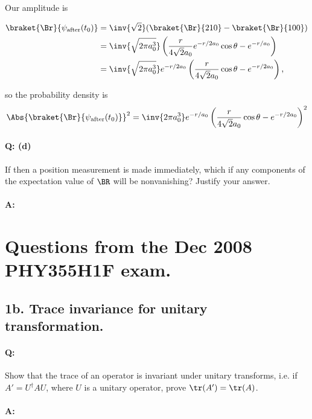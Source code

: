 Our amplitude is 

\begin{align*}
\braket{\Br}{\psi_{\text{after}}(t_0)}
&= \inv{\sqrt{2}} (\braket{\Br}{210} - \braket{\Br}{100}) \\
&= \inv{\sqrt{2 \pi a_0^3}}
\left(
\frac{r}{4\sqrt{2} a_0} e^{-r/2a_0} \cos\theta
-e^{-r/a_0}
\right) \\
&= \inv{\sqrt{2 \pi a_0^3}}
e^{-r/2 a_0} 
\left(
\frac{r}{4\sqrt{2} a_0} \cos\theta
-e^{-r/2 a_0}
\right),
\end{align*}

so the probability density is
\begin{equation}\label{eqn:qmIexamPractice2007Dec:4:300}
\Abs{\braket{\Br}{\psi_{\text{after}}(t_0)}}^2
= \inv{2 \pi a_0^3}
e^{-r/a_0} 
\left(
\frac{r}{4\sqrt{2} a_0} \cos\theta
-e^{-r/2 a_0}
\right)^2 
\end{equation}

\paragraph{Q: (d)}

If then a position measurement is made immediately, which if any components of the expectation value of $\BR$ will be nonvanishing?  Justify your answer.

\paragraph{A:}

\section{Questions from the Dec 2008 PHY355H1F exam.}

\subsection{1b. Trace invariance for unitary transformation.}

\paragraph{Q:} Show that the trace of an operator is invariant under unitary transforms, i.e. if $A' = U^\dagger A U$, where $U$ is a unitary operator, prove $\tr(A') = \tr(A)$.

\paragraph{A:} 


